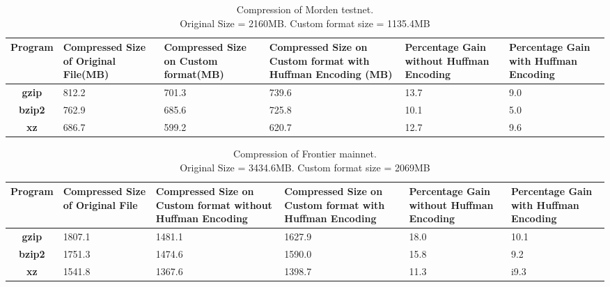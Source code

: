 \begin{table*}
\centering
\captionsetup{justification=centering}
\begin{tabular}{ >{\bfseries}c| p{2cm} | p{2cm} | p{2cm} | p{1.5cm} | p{1.5cm} }
	Program & {Compressed Size of Original File(MB)} & {Compressed Size on Custom format(MB)} & {Compressed Size on Custom format with Huffman Encoding (MB)} & Percentage Gain without Huffman Encoding & Percentage Gain with Huffman Encoding \\
  \hline
  gzip  & 812.2 & 701.3 & 739.6 & 13.7 & 9.0 \\
  bzip2 & 762.9 & 685.6 & 725.8 & 10.1 & 5.0 \\
  xz   & 686.7 & 599.2 &  620.7 & 12.7 & 9.6 \\
\end{tabular}
\caption{Compression of Morden testnet. \\Original Size = 2160MB. Custom format size = 1135.4MB}
\label{tab:compmorden}
\end{table*}


\begin{table*}
	\centering
\captionsetup{justification=centering}
\begin{tabular}{ >{\bfseries}c| p{2cm} | p{2cm} | p{2cm} | p{1.5cm} | p{1.5cm} }
	Program & {Compressed Size of Original File} & {Compressed Size on Custom format without Huffman Encoding} & {Compressed Size on Custom format with Huffman Encoding} &Percentage Gain without Huffman Encoding & Percentage Gain with Huffman Encoding\\
  \hline
  gzip  & 1807.1 & 1481.1 & 1627.9 & 18.0 & 10.1 \\
  bzip2 & 1751.3 & 1474.6 & 1590.0 & 15.8 & 9.2 \\
  xz   & 1541.8 & 1367.6 & 1398.7 & 11.3  & i9.3 \\
\end{tabular}
\caption{Compression of Frontier mainnet. \\ Original Size = 3434.6MB. Custom format size = 2069MB}
\label{tab:compfrontier}
\end{table*}

